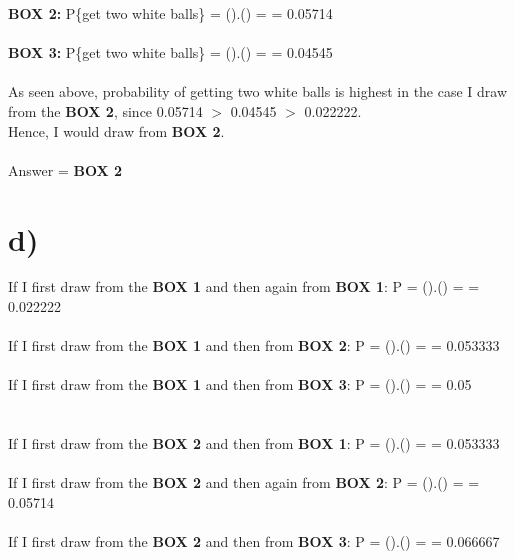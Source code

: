 \documentclass[11pt]{article}
\begin{document}
\textbf{BOX 2:} P\{get two white balls\} = ().() =  = 0.05714 \\ \\ 

\textbf{BOX 3:} P\{get two white balls\} = ().() =  = 0.04545 \\ \\ 

\noindent As seen above, probability of getting two white balls is highest in the case I draw from the \textbf{BOX 2}, since 0.05714 $>$ 0.04545 $>$ 0.022222. \\
Hence, I would draw from \textbf{BOX 2}. \\ \\
Answer = \textbf{BOX 2} \newpage


\section*{d)}
If I first draw from the \textbf{BOX 1} and then again from \textbf{BOX 1}: \space
P = ().() =  = 0.022222 \\ \\

\noindent If I first draw from the \textbf{BOX 1} and then from \textbf{BOX 2}: \space
P = ().() =  = 0.053333 \\ \\

\noindent If I first draw from the \textbf{BOX 1} and then from \textbf{BOX 3}: \space
P = ().() =  = 0.05 \\ \\  \\

\noindent If I first draw from the \textbf{BOX 2} and then from \textbf{BOX 1}: \space
P = ().() =  = 0.053333 \\ \\

\noindent If I first draw from the \textbf{BOX 2} and then again from \textbf{BOX 2}: \space
P = ().() =  = 0.05714 \\ \\

\noindent If I first draw from the \textbf{BOX 2} and then from \textbf{BOX 3}: \space
P = ().() =  = 0.066667 \\ \\ \\
\end{document}
